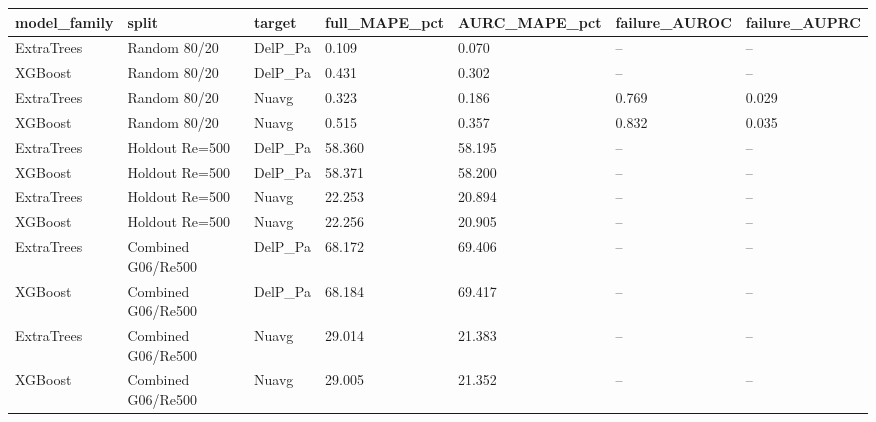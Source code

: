 \begin{tabular}{lllllll}
\hline
model_family & split & target & full_MAPE_pct & AURC_MAPE_pct & failure_AUROC & failure_AUPRC \\
\hline
ExtraTrees & Random 80/20 & DelP_Pa & 0.109 & 0.070 & -- & -- \\
XGBoost & Random 80/20 & DelP_Pa & 0.431 & 0.302 & -- & -- \\
ExtraTrees & Random 80/20 & Nuavg & 0.323 & 0.186 & 0.769 & 0.029 \\
XGBoost & Random 80/20 & Nuavg & 0.515 & 0.357 & 0.832 & 0.035 \\
ExtraTrees & Holdout Re=500 & DelP_Pa & 58.360 & 58.195 & -- & -- \\
XGBoost & Holdout Re=500 & DelP_Pa & 58.371 & 58.200 & -- & -- \\
ExtraTrees & Holdout Re=500 & Nuavg & 22.253 & 20.894 & -- & -- \\
XGBoost & Holdout Re=500 & Nuavg & 22.256 & 20.905 & -- & -- \\
ExtraTrees & Combined G06/Re500 & DelP_Pa & 68.172 & 69.406 & -- & -- \\
XGBoost & Combined G06/Re500 & DelP_Pa & 68.184 & 69.417 & -- & -- \\
ExtraTrees & Combined G06/Re500 & Nuavg & 29.014 & 21.383 & -- & -- \\
XGBoost & Combined G06/Re500 & Nuavg & 29.005 & 21.352 & -- & -- \\
\hline
\end{tabular}

